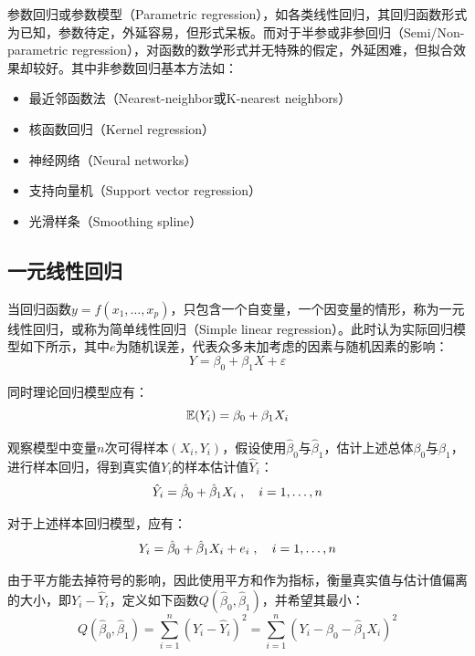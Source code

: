 \documentclass[11pt]{article}
\begin{document}
参数回归或参数模型（Parametric regression），如各类线性回归，其回归函数形式为已知，参数待定，外延容易，但形式呆板。而对于半参或非参回归（Semi/Non-parametric regression），对函数的数学形式并无特殊的假定，外延困难，但拟合效果却较好。其中非参数回归基本方法如：
\begin{itemize}
    \item 最近邻函数法（Nearest-neighbor或K-nearest neighbors）
    \item 核函数回归（Kernel regression）
    \item 神经网络（Neural networks）
    \item 支持向量机（Support vector regression）
    \item 光滑样条（Smoothing spline）
\end{itemize}

\subsection{一元线性回归}

当回归函数$y=f(x_1,\dots,x_p)$，只包含一个自变量，一个因变量的情形，称为一元线性回归，或称为简单线性回归（Simple linear regression）。此时认为实际回归模型如下所示，其中$e$为随机误差，代表众多未加考虑的因素与随机因素的影响：
\begin{equation*}
    Y = \beta_0 + \beta_1 X + \varepsilon
\end{equation*}

同时理论回归模型应有：
\begin{equation*}
    \mathbb{E}(Y_i) = \beta_0 + \beta_1 X_i
\end{equation*}

观察模型中变量$n$次可得样本$(X_i,Y_i)$，假设使用$\hat{\beta}_0$与$\hat{\beta}_1$，估计上述总体$\beta_0$与$\beta_1$，进行样本回归，得到真实值$Y_i$的样本估计值$\hat{Y}_i$：
\begin{equation*}
    \hat{Y}_i = \hat{\beta}_0 + \hat{\beta}_1 X_i \;,\quad i =1,\dots,n
\end{equation*}

对于上述样本回归模型，应有：
\begin{equation*}
    Y_i = \hat{\beta}_0 + \hat{\beta}_1 X_i + e_i \;,\quad i =1,\dots,n
\end{equation*}

由于平方能去掉符号的影响，因此使用平方和作为指标，衡量真实值与估计值偏离的大小，即$Y_i - \hat{Y}_i$，定义如下函数$Q(\hat{\beta}_0, \hat{\beta}_1)$，并希望其最小：
\begin{equation*}
    Q(\hat{\beta}_0, \hat{\beta}_1)
    = \sum_{i=1}^{n} \left( Y_i - \hat{Y}_i \right)^2
    = \sum_{i=1}^{n} \left( Y_i - \hat{\beta}_0 - \hat{\beta}_1 X_i \right)^2
\end{equation*}
\end{document}
